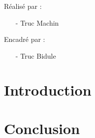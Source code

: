 \documentclass[11pt]{article}
\begin{document}
\begin{center}
	\begin{minipage}[t]{\linewidth}
		\begin{minipage}[t]{.5\linewidth}
		   \raggedleft
		   {\large Réalisé par :}
		\end{minipage}
		\begin{minipage}[t]{.5\linewidth}
		   {\large \begin{itemize}
		   \item[-] Truc Machin
		   \end{itemize} }
		\end{minipage}
		
		\vspace{1cm}
		
		\begin{minipage}[t]{.5\linewidth}
		   \raggedleft
		   {\large Encadré par :}
		\end{minipage}
		\begin{minipage}[t]{.5\linewidth}
		   {\large \begin{itemize}
		   	\item[-] Truc Bidule
		   	\end{itemize}}
		\end{minipage}
	\end{minipage}
\end{center}
\newpage

\tableofcontents
\newpage

\section{Introduction}
\newpage

\section{Conclusion}
\newpage
\end{document}
